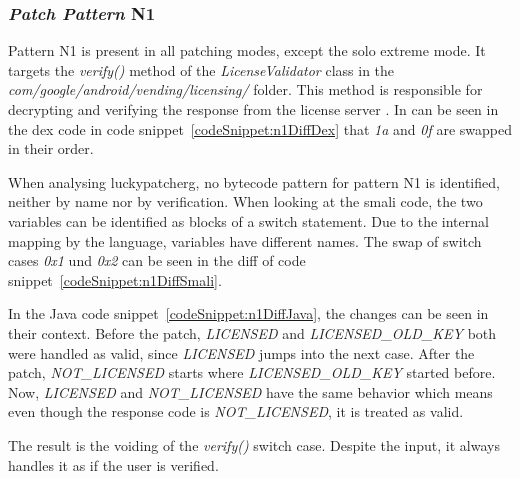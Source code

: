 \subsubsection{\textit{Patch Pattern} N1}
Pattern N1 is present in all patching modes, except the solo extreme mode.
It targets the \textit{verify()} method of the \textit{LicenseValidator} class in the \textit{com/google/android/vending/licensing/} folder.
This method is responsible for decrypting and verifying the response from the license server \cite{developersLicensingReference}.
\newline
In can be seen in the dex code in code snippet~\ref{codeSnippet:n1DiffDex} that \textit{1a} and \textit{0f} are swapped in their order.
\newline

When analysing \gls{luckypatcherg}, no bytecode pattern for pattern N1 is identified, neither by name nor by verification.
\newline
When looking at the smali code, the two variables can be identified as blocks of a switch statement.
Due to the internal mapping by the language, variables have different names.
The swap of switch cases \textit{0x1} und \textit{0x2} can be seen in the diff of code snippet~\ref{codeSnippet:n1DiffSmali}.
\newline

In the Java code snippet~\ref{codeSnippet:n1DiffJava}, the changes can be seen in their context.
Before the patch, \textit{LICENSED} and \textit{LICENSED\_OLD\_KEY} both were handled as valid, since \textit{LICENSED} jumps into the next case.
After the patch, \textit{NOT\_LICENSED} starts where \textit{LICENSED\_OLD\_KEY} started before.
Now, \textit{LICENSED} and \textit{NOT\_LICENSED} have the same behavior which means even though the response code is \textit{NOT\_LICENSED}, it is treated as valid.
\newline

The result is the voiding of the \textit{verify()} switch case.
Despite the input, it always handles it as if the user is verified.


